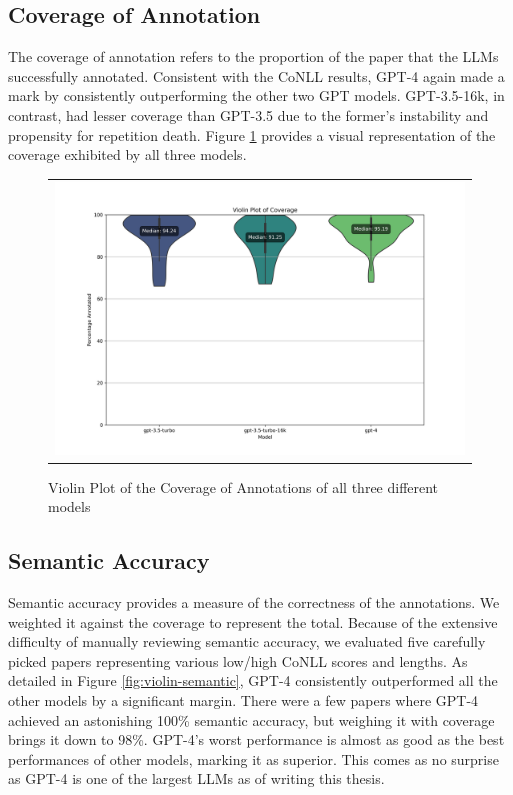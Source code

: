 \subsection{Coverage of Annotation}

The coverage of annotation refers to the proportion of the paper that the LLMs successfully annotated. Consistent with the CoNLL results, GPT-4 again made a mark by consistently outperforming the other two GPT models. GPT-3.5-16k, in contrast, had lesser coverage than GPT-3.5 due to the former's instability and propensity for repetition death. Figure \ref{fig:violin-coverage} provides a visual representation of the coverage exhibited by all three models.

\begin{figure}[htpb]
  \centering
  \begin{tabular}{c}
  \includegraphics[width=14cm]{images/coverage.png}
  \end{tabular}
  \caption[Distribution of Coverage]{Violin Plot of the Coverage of Annotations of all three different models}\label{fig:violin-coverage}
\end{figure}
 
\subsection{Semantic Accuracy}

Semantic accuracy provides a measure of the correctness of the annotations. We weighted it against the coverage to represent the total. Because of the extensive difficulty of manually reviewing semantic accuracy, we evaluated five carefully picked papers representing various low/high CoNLL scores and lengths. As detailed in Figure \ref{fig:violin-semantic}, GPT-4 consistently outperformed all the other models by a significant margin. There were a few papers where GPT-4 achieved an astonishing 100\% semantic accuracy, but weighing it with coverage brings it down to 98\%. GPT-4's worst performance is almost as good as the best performances of other models, marking it as superior. This comes as no surprise as GPT-4 is one of the largest LLMs as of writing this thesis.


